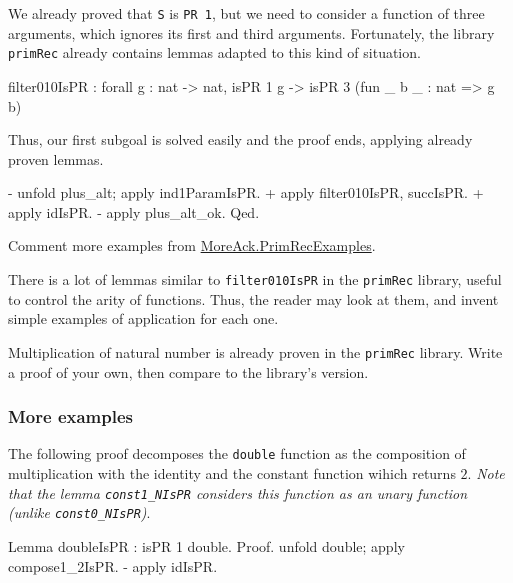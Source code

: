 We already proved that \texttt{S} is \texttt{PR 1}, but we need to consider a function of three arguments, which ignores its first and third arguments.
Fortunately, the library \texttt{primRec} already contains lemmas adapted to this kind of situation.

\begin{Coqanswer}
filter010IsPR :
forall g : nat -> nat, isPR 1 g -> isPR 3 (fun _ b _ : nat => g b)
\end{Coqanswer}

Thus, our first subgoal is solved easily and the proof ends, applying already proven lemmas.


\begin{Coqsrc}
 - unfold plus_alt; apply ind1ParamIsPR.
    + apply filter010IsPR, succIsPR.
    + apply idIsPR.
  - apply plus_alt_ok. 
Qed.
\end{Coqsrc}


\begin{todo}
Comment more examples from   \href{../theories/html/hydras.MoreAck.PrimRecExamples.html}{MoreAck.PrimRecExamples}.
\end{todo}

\begin{exercise}
There is a lot of lemmas similar to \texttt{filter010IsPR} in the \texttt{primRec} library, useful to control the arity of functions.
Thus, the reader may look at them, and invent simple examples of application for each one.
\end{exercise}

\begin{exercise}
Multiplication of natural number is already proven in the \texttt{primRec} library. Write a proof of your own, then compare to the library's version.
\end{exercise}

\subsubsection{More examples}

The following proof decomposes the \texttt{double} function as the composition of 
multiplication with the identity and the constant function wihich returns $2$.
\emph{Note that the lemma \texttt{const1\_NIsPR} considers this function as an unary function (unlike \texttt{const0\_NIsPR})}. 

\begin{Coqsrc}
Lemma doubleIsPR : isPR 1 double.
Proof.
  unfold double; apply compose1_2IsPR.
  - apply idIsPR.
\end{Coqsrc}


